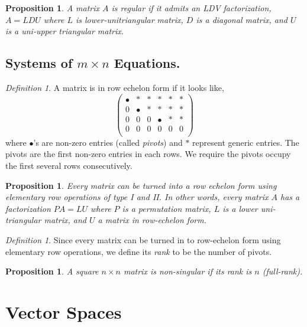 \documentclass[12pt]{amsart}
\newtheorem{proposition}[theorem]{Proposition}
\theoremstyle{remark}
\newtheorem{definition}[theorem]{Definition}
\numberwithin{equation}{section}
\begin{document}
\begin{proposition}
	A matrix $A$ is regular if it admits an LDV factorization, $A=LDU$ where $L$ is lower-unitriangular matrix, $D$ is a diagonal matrix, and $U$ is a uni-upper triangular matrix.
\end{proposition}
\subsection{Systems of $m\times n$ Equations.}
\begin{definition}
A matrix is in row echelon form if it looks like,
	\[
\begin{pmatrix}
\bullet & * & * & * & * & * \\
0 & \bullet & * & * & * & * \\
0 & 0 & 0 & \bullet & * & * \\
0 & 0 & 0 & 0 & 0 & 0 \\
\end{pmatrix}
\]
where $\bullet$'s are non-zero entries (called \emph{pivots}) and $*$ represent generic entries. The pivots are the first non-zero entries in each rows. We require the pivots occupy the first several rows consecutively.
\end{definition}
\begin{proposition}
	Every matrix can be turned into a row echelon form using elementary row operations of type I and II. In other words, every matrix $A$ has a factorization $PA=LU$ where $P$ is a permutation matrix, $L$ is a lower uni-triangular matrix, and $U$ a matrix in row-echelon form.
\end{proposition}
\begin{definition}\label{def:rank}
	Since every matrix can be turned in to row-echelon form using elementary row operations, we define its \emph{rank} to be the number of pivots.
\end{definition}
\begin{proposition}
	A square $n\times n$ matrix is non-singular if its rank is $n$ (full-rank).
\end{proposition}



\section{Vector Spaces}
\end{document}

